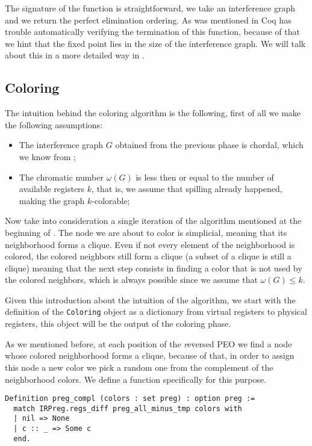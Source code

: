 The signature of the function is straightforward, we take an interference graph and we return the perfect elimination ordering.
As was mentioned in  Coq has trouble automatically verifying the termination of this function, because of that we hint that the fixed point lies in the size of the interference graph. We will talk about this in a more detailed way in .

\subsection{Coloring}
\label{subsec:coloring}

The intuition behind the coloring algorithm is the following, first of all we make the following assumptions:

\begin{itemize}
  \item The interference graph $G$ obtained from the previous phase is chordal, which we know from ;
  \item The chromatic number $\omega(G)$ is less then or equal to the number of available registers $k$, that is, we assume that spilling already happened, making the graph $k$-colorable;
\end{itemize}

Now take into consideration a single iteration of the algorithm mentioned at the beginning of . The node we are about to color is simplicial, meaning that its neighborhood forms a clique. Even if not every element of the neighborhood is colored, the colored neighbors still form a clique (a subset of a clique is still a clique) meaning that the next step consists in finding a color that is not used by the colored neighbors, which is always possible since we assume that $\omega(G) \leq k$.

Given this introduction about the intuition of the algorithm, we start with the definition of the \texttt{Coloring} object as a dictionary from virtual registers to physical registers, this object will be the output of the coloring phase.

As we mentioned before, at each position of the \textit reversed PEO we find a node whose colored neighborhood forms a clique, because of that, in order to assign this node a new color we pick a random one from the complement of the neighborhood colors. We define a function specifically for this purpose.

\begin{lstlisting}[style=Coq]
Definition preg_compl (colors : set preg) : option preg :=
  match IRPreg.regs_diff preg_all_minus_tmp colors with
  | nil => None
  | c :: _ => Some c
  end.
\end{lstlisting}

